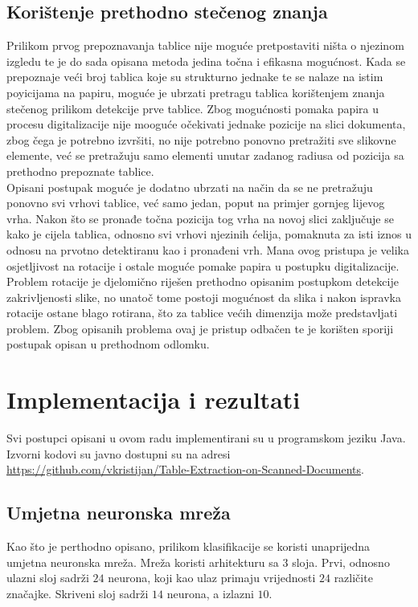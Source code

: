\documentclass[times, utf8, zavrsni, numeric]{fer}
\begin{document}
\section{Korištenje prethodno stečenog znanja}
Prilikom prvog prepoznavanja tablice nije moguće pretpostaviti ništa o njezinom izgledu te je do sada opisana metoda jedina točna i efikasna mogućnost.
Kada se prepoznaje veći broj tablica koje su strukturno jednake te se nalaze na istim poyicijama na papiru, moguće je ubrzati pretragu tablica korištenjem znanja stečenog prilikom detekcije prve tablice. 
Zbog mogućnosti pomaka papira u procesu digitalizacije nije mooguće očekivati jednake pozicije na slici dokumenta, zbog čega je potrebno izvršiti, no nije potrebno ponovno pretražiti sve slikovne elemente, već se pretražuju samo elementi unutar zadanog radiusa od pozicija sa prethodno prepoznate tablice.\\

Opisani postupak moguće je dodatno ubrzati na način da se ne pretražuju ponovno svi vrhovi tablice, već samo jedan, poput na primjer gornjeg lijevog vrha.
Nakon što se pronađe točna pozicija tog vrha na novoj slici zaključuje se kako je cijela tablica, odnosno svi vrhovi njezinih ćelija, pomaknuta za isti iznos u odnosu na prvotno detektiranu kao i pronađeni vrh.
Mana ovog pristupa je velika osjetljivost na rotacije i ostale moguće pomake papira u postupku digitalizacije. 
Problem rotacije je djelomično riješen prethodno opisanim postupkom detekcije zakrivljenosti slike, no unatoč tome postoji mogućnost da slika i nakon ispravka rotacije ostane blago rotirana, što za tablice većih dimenzija može predstavljati problem.
Zbog opisanih problema ovaj je pristup odbačen te je korišten sporiji postupak opisan u prethodnom odlomku.


\chapter{Implementacija i rezultati} 
Svi postupci opisani u ovom radu implementirani su u programskom jeziku Java.
Izvorni kodovi su javno dostupni su na adresi \href{https://github.com/vkristijan/Table-Extraction-on-Scanned-Documents}{https://github.com/vkristijan/Table-Extraction-on-Scanned-Documents}.

\section{Umjetna neuronska mreža}
Kao što je perthodno opisano, prilikom klasifikacije se koristi unaprijedna umjetna neuronska mreža. 
Mreža koristi arhitekturu sa $3$ sloja.
Prvi, odnosno ulazni sloj sadrži $24$ neurona, koji kao ulaz primaju vrijednosti $24$ različite značajke.
Skriveni sloj sadrži $14$ neurona, a izlazni $10$.\\
\end{document}
